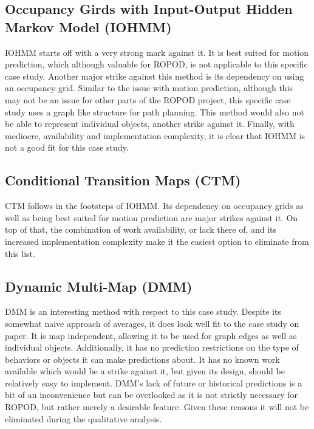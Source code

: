   \subsection { Occupancy Girds with Input-Output Hidden Markov Model (IOHMM) }
  IOHMM starts off with a very strong mark against it. It is best suited for
  motion prediction, which although valuable for ROPOD, is not applicable to
  this specific case study. Another major strike against this method is its
  dependency on using an occupancy grid. Similar to the issue with motion
  prediction, although this may not be an issue for other parts of the ROPOD
  project, this specific case study uses a graph like structure for path
  planning. This method would also not be able to represent individual objects,
  another strike against it. Finally, with mediocre, availability and
  implementation complexity, it is clear that IOHMM is not a good fit for this
  case study.

  \subsection { Conditional Transition Maps (CTM) }
  CTM follows in the footsteps of IOHMM. Its dependency on occupancy grids as
  well as being best suited for motion prediction are major strikes against it.
  On top of that, the combination of work availability, or lack there of, and
  its increased implementation complexity make it the easiest option to
  eliminate from this list.

  \subsection { Dynamic Multi-Map (DMM) }
  DMM is an interesting
  method with respect to this case study. Despite its somewhat naive approach
  of averages, it does look well fit to the case study on paper. It is map
  independent, allowing it to be used for graph edges as well as individual
  objects. Additionally, it has no prediction restrictions on the type of
  behaviors or objects it can make predictions about. It has no known work
  available which would be a strike against it, but given its design, should
  be relatively easy to implement. DMM's lack of future or historical
  predictions is a bit of an inconvenience but can be overlooked as it is not
  strictly necessary for ROPOD, but rather merely a desirable feature. Given
  these reasons it will not be eliminated during the qualitative analysis.

